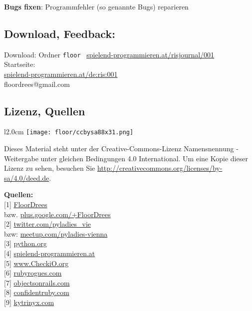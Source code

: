 \documentclass[10pt,a4paper,ngerman,twoside]{article} %
\newcommand{\SepRule}{\noindent	%
\begin{center}
\rule{250pt}{1pt} %
\end{center}
}
\begin{document}
\textbf{Bugs fixen}: Programmfehler (so genannte Bugs) reparieren \\


\subsection*{Download, Feedback:}
\footnotesize{
Download: Ordner \texttt{floor} \Mundus\ \href{http://spielend-programmieren.at/risjournal/001}{spielend-programmieren.at/risjournal/001}\\
Startseite:\\
\href{http://spielend-programmieren.at/de:ris:001}{spielend-programmieren.at/de:ris:001}\\ 
\Letter\:  floordrees@gmail.com \\}
\normalsize
 

\subsection*{Lizenz, Quellen}

\begin{wrapfigure}{l}{2.0cm}
\texttt{[image: floor/ccbysa88x31.png]}
\end{wrapfigure}
Dieses Material steht unter der Creative-Commons-Lizenz Namensnennung - Weitergabe unter gleichen Bedingungen 4.0 International. Um eine Kopie dieser Lizenz zu sehen, besuchen Sie \url{http://creativecommons.org/licenses/by-sa/4.0/deed.de}.

\textbf{Quellen:} \\
{[}1{]} \href{https://twitter.com/FloorDrees}{FloorDrees} \\
bzw.    \href{https://plus.google.com/+FloorDrees/about}{plus.google.com/+FloorDrees} \\
{[}2{]} \href{https://twitter.com/pyladies_vie}{twitter.com/pyladies\_vie} \\
bzw: \href{http://www.meetup.com/pyladies-vienna}{meetup.com/pyladies-vienna} \\
{[}3{]} \href{http://python.org}{python.org} \\
{[}4{]} \href{http://spielend-programmieren.at}{spielend-programmieren.at} \\
{[}5{]} \href{http://www.checkio.org/}{www.CheckiO.org} \\
{[}6{]} \href{http://rubyrogues.com/}{rubyrogues.com} \\
{[}7{]} \href{http://objectsonrails.com/}{objectsonrails.com} \\
{[}8{]} \href{http://www.confidentruby.com/}{confidentruby.com} \\
{[}9{]} \href{http://kytrinyx.com/}{kytrinyx.com} 


\end{document}

